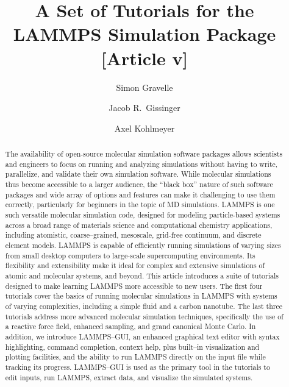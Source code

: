 \documentclass[9pt,tutorial]{livecoms}
\title{A Set of Tutorials for the LAMMPS Simulation Package [Article v\versionnumber]}
\author[1*]{Simon Gravelle}
\affil[1]{University Grenoble Alpes, CNRS, LIPhy, Grenoble, 38000, France}
\author[2]{Jacob R.~Gissinger}
\affil[2]{Stevens Institute of Technology, Hoboken, NJ 07030, USA}
\author[3]{Axel Kohlmeyer}
\affil[3]{Institute for Computational Molecular Science, Temple University, Philadelphia, PA 19122, USA}
\begin{document}
\begin{frontmatter}
\maketitle

\begin{abstract}
  The availability of open-source molecular simulation software packages
  allows scientists and engineers to focus on running and analyzing
  simulations without having to write, parallelize, and validate their
  own simulation software.  While molecular simulations thus become
  accessible to a larger audience, the ``black box'' nature of such
  software packages and wide array of options and features can make it
  challenging to use them correctly, particularly for beginners in the
  topic of MD simulations.  LAMMPS is one such versatile molecular
  simulation code, designed for modeling particle-based systems across a
  broad range of materials science and computational chemistry
  applications, including atomistic, coarse--grained, mesoscale,
  grid-free continuum, and discrete element models.  LAMMPS is capable
  of efficiently running simulations of varying sizes from small desktop
  computers to large-scale supercomputing environments.  Its flexibility
  and extensibility make it ideal for complex and extensive simulations
  of atomic and molecular systems, and beyond.  This article introduces a
  suite of tutorials designed to make learning LAMMPS more accessible to
  new users.  The first four tutorials cover the basics of running
  molecular simulations in LAMMPS with systems of varying complexities,
  including a simple fluid and a carbon nanotube.  The last three
  tutorials address more advanced molecular simulation techniques,
  specifically the use of a reactive force field, enhanced sampling, and
  grand canonical Monte Carlo.
  In addition, we introduce LAMMPS--GUI, an enhanced graphical text
  editor with syntax highlighting, command completion, context help,
  plus built--in visualization and plotting facilities, and the ability
  to run LAMMPS directly on the input file while tracking its progress.
  LAMMPS--GUI is used as the primary tool in the tutorials to edit
  inputs, run LAMMPS, extract data, and visualize the simulated systems.
\end{abstract}

\end{frontmatter}
\end{document}
